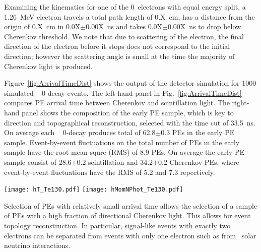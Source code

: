 Examining the kinematics for one of the 0\nbb~electrons with equal energy split, a 1.26~MeV electron travels a total path length of 0.X~cm, 
has a distance from the origin of 0.X~cm in 0.0X$\pm$0.00X~ns  and takes 0.0X$\pm$0.00X~ns to drop below Cherenkov threshold. 
We note that due to scattering of the electron, the final direction of the electron before it stops does not correspond to the initial 
direction; however the scattering angle is small at the time the majority of Cherenkov light is produced.

Figure~\ref{fig:ArrivalTimeDist} shows the output of the detector simulation for 1000 simulated \Te~ 0\nbb-decay 
events. The left-hand panel in Fig.~\ref{fig:ArrivalTimeDist} compares PE arrival time between Cherenkov and scintillation light.
The right-hand panel shows the composition of the early PE sample, which is key to direction and topographical reconstruction, 
selected with the time cut of 33.5~ns. On average each \Te~ 0\nbb-decay produces total of 62.8$\pm$0.3 PEs in the early PE sample. 
Event-by-event fluctuations on the total number of PEs in the early sample have the root mean squre (RMS) of 8.9 PEs. 
On average the early PE sample consist of 28.6$\pm$0.2 scintillation and 34.2$\pm$0.2 Cherenkov PEs, where event-by-event fluctuations have
the RMS of 5.2 and 7.3 repectively.



\begin{figure*}[ht]
  \centering
  \texttt{[image: hT\_Te130.pdf]}
  \texttt{[image: hMomNPhot\_Te130.pdf]}
  \caption{\emph{Left:} Photo-electron (PE) arrival times after
    application of the photo-detector transit time spread (TTS) of 100~ps for the default simulation 
    of \Te~0\nbb-decay produced at the center of the detector. 
    Scintillation PEs (blue solid line) are compared to Cherenkov PEs (red dotted line)
    The vertical line at 33.5~ns indicates the time cut for the selection of the early PE sample.
    \emph{Right:} Composition of the early PE sample: 
    number of Cherenkov (\emph{dashed red line}), scintillation (\emph{dotted blue line}), 
    and total (\emph{solid black line}) PEs per event.} 
\label{fig:ArrivalTimeDist}
\end{figure*}


Selection of PEs with relatively small arrival time allows the selection of a sample of PEs with a high fraction of directional Cherenkov light.
This allows for event topology reconstruction. In particular, signal-like events with exactly two electrons can be separated from events 
with only one electron such as from \B~solar neutrino interactions.


